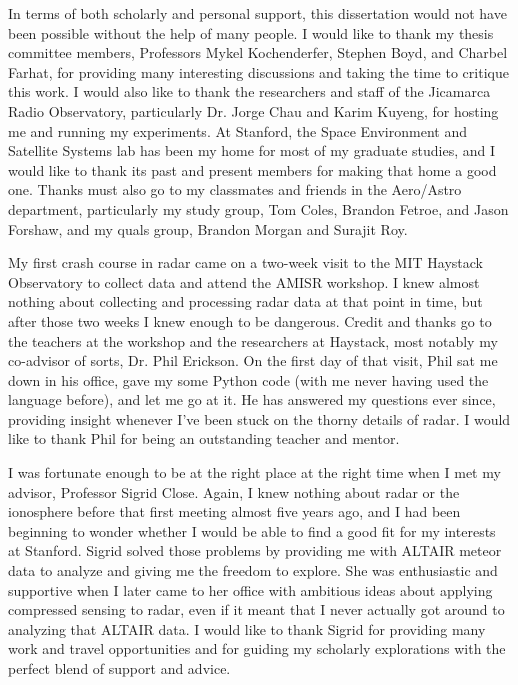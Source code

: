 In terms of both scholarly and personal support, this dissertation would not have been possible without the help of many people. I would like to thank my thesis committee members, Professors Mykel Kochenderfer, Stephen Boyd, and Charbel Farhat, for providing many interesting discussions and taking the time to critique this work. I would also like to thank the researchers and staff of the Jicamarca Radio Observatory, particularly Dr. Jorge Chau and Karim Kuyeng, for hosting me and running my experiments. At Stanford, the Space Environment and Satellite Systems lab has been my home for most of my graduate studies, and I would like to thank its past and present members for making that home a good one. Thanks must also go to my classmates and friends in the Aero/Astro department, particularly my study group, Tom Coles, Brandon Fetroe, and Jason Forshaw, and my quals group, Brandon Morgan and Surajit Roy.

My first crash course in radar came on a two-week visit to the MIT Haystack Observatory to collect data and attend the AMISR workshop. I knew almost nothing about collecting and processing radar data at that point in time, but after those two weeks I knew enough to be dangerous. Credit and thanks go to the teachers at the workshop and the researchers at Haystack, most notably my co-advisor of sorts, Dr. Phil Erickson. On the first day of that visit, Phil sat me down in his office, gave my some Python code (with me never having used the language before), and let me go at it. He has answered my questions ever since, providing insight whenever I've been stuck on the thorny details of radar. I would like to thank Phil for being an outstanding teacher and mentor.

I was fortunate enough to be at the right place at the right time when I met my advisor, Professor Sigrid Close. Again, I knew nothing about radar or the ionosphere before that first meeting almost five years ago, and I had been beginning to wonder whether I would be able to find a good fit for my interests at Stanford. Sigrid solved those problems by providing me with ALTAIR meteor data to analyze and giving me the freedom to explore. She was enthusiastic and supportive when I later came to her office with ambitious ideas about applying compressed sensing to radar, even if it meant that I never actually got around to analyzing that ALTAIR data. I would like to thank Sigrid for providing many work and travel opportunities and for guiding my scholarly explorations with the perfect blend of support and advice.

